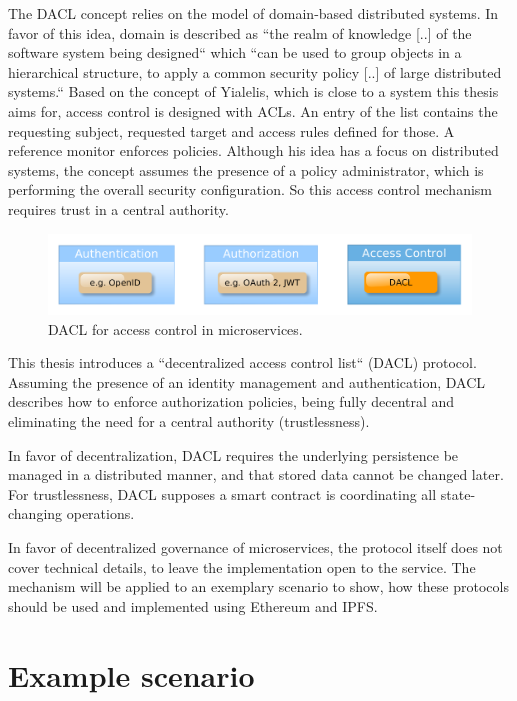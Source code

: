 \documentclass[12pt, conference]{IEEEtran}
\begin{document}
The DACL concept relies on the model of domain-based distributed systems. In favor of this idea, domain is described as ``the realm of knowledge [..] of the software system being designed`` \cite{b2} which ``can be used to group
objects in a hierarchical structure, to apply a common security policy [..] of large distributed systems.`` \cite{b1} Based on the concept of Yialelis, which is close to a system this thesis aims for, access control is designed with ACLs. An entry of the list contains the requesting subject, requested target and access rules defined for those. A reference monitor enforces policies. Although his idea has a focus on distributed systems, the concept assumes the presence of a policy administrator, which is performing the overall security configuration. So this access control mechanism requires trust in a central authority. \\

\begin{figure}[!h]
  \includegraphics[width=\linewidth]{figures/access-control.png}
  \caption{DACL for access control in microservices.}
  \label{fig:access-control}
\end{figure}

This thesis introduces a ``decentralized access control list`` (DACL) protocol. Assuming the presence of an identity management and authentication, DACL describes how to enforce authorization policies, being fully decentral and eliminating the need for a central authority (trustlessness). 

In favor of decentralization, DACL requires the underlying persistence be managed in a distributed manner, and that stored data cannot be changed later. For trustlessness, DACL supposes a smart contract is coordinating all state-changing operations.

In favor of decentralized governance of microservices, the protocol itself does not cover technical details, to leave the implementation open to the service. The mechanism will be applied to an exemplary scenario to show, how these protocols should be used and implemented using Ethereum and IPFS.


\section{Example scenario}
\end{document}
